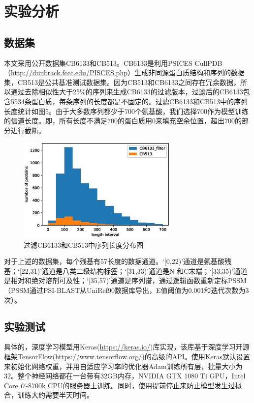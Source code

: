 \documentclass[a4paper, tikz]{article}
\begin{document}
\section{实验分析}
\subsection{数据集}

本文采用公开数据集CB6133和CB513。CB6133是利用PSICES CullPDB（\url{http://dunbrack.fccc.edu/PISCES.php}）生成非同源蛋白质结构和序列的数据集，CB513是公共基准测试数据集。因为CB513和CB6133之间存在冗余数据，所以通过去除相似性大于25\%的序列来生成CB6133的过滤版本，过滤后的CB6133包含5534条蛋白质，每条序列的长度都是不固定的。过滤CB6133和CB513中的序列长度统计如图5。由于大多数序列都少于700个氨基酸，我们选择700作为模型训练的信道长度。即，所有长度不满足700的蛋白质用0来填充空余位置，超出700的部分进行截断。

\begin{figure}[htbp]
    \centering
    \includegraphics[width=0.7\textwidth]{pic/data_hist}
	\caption{过滤CB6133和CB513中序列长度分布图}\label{fig:5}
\end{figure}

对于上述的数据集，每个残基有57长度的数据通道。‘[0,22)’通道是氨基酸残基；‘[22,31)’通道是八类二级结构标签；‘[31,33)’通道是N-和C末端；‘[33,35)’通道是相对和绝对溶剂可及性；‘[35,57)’通道是序列谱，通过逻辑函数重新定标PSSM（PSSM通过PSI-BLAST从UniRef90数据库导出，E值阈值为0.001和迭代次数为3次）。

\subsection{实验测试}

具体的，深度学习模型用Keras(\url{https://keras.io/})库实现，该库基于深度学习开源框架TensorFlow(\url{https://www.tensorflow.org/})的高级的API。使用Keras默认设置来初始化网络权重，并用自适应学习率的优化器Adam训练所有层，批量大小为32。整个神经网络都在一台带有32GB内存，NVIDIA GTX 1080 Ti GPU，Intel Core i7-8700k CPU的服务器上训练。同时，使用提前停止来防止模型发生过拟合，训练大约需要半天时间。
\end{document}
